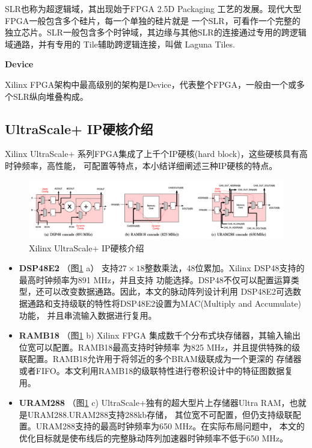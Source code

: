SLR也称为超逻辑域，其出现始于FPGA 2.5D Packaging 工艺的发展。现代大型FPGA一般包含多个硅片，每一个单独的硅片就是
一个SLR，可看作一个完整的独立芯片。SLR一般包含多个时钟域，其边缘与其他SLR的连接通过专用的跨逻辑域通路，并有专用的
Tile辅助跨逻辑连接，叫做 Laguna Tiles.


{\bf Device}

Xilinx FPGA架构中最高级别的架构是Device，代表整个FPGA，一般由一个或多个SLR纵向堆叠构成。






\subsection{UltraScale+ IP硬核介绍}

Xilinx UltraScale+ 系列FPGA集成了上千个IP硬核(hard block)，这些硬核具有高时钟频率，高性能，
可配置等特点，本小结详细阐述三种IP硬核的特点。

\begin{figure}[h]
    \centering
	\includegraphics[width=\textwidth]{figure/hardblocks}
	\caption{Xilinx UltraScale+ IP硬核介绍} 
	\label{fig:hardblocks}
\end{figure}

\begin{itemize}
    \item {\bf DSP48E2} （图\ref{fig:hardblocks} a）
    支持$27\times18$整数乘法，48位累加。Xilinx DSP48支持的最高时钟频率为891 MHz，并且支持
    功能选择。DSP48不仅可以配置运算类型，还可以改变数据通路。因此，本文的脉动阵列设计利用
    DSP48E2可选数据通路和支持级联的特性将DSP48E2设置为MAC(Multiply and Accumulate)功能，
    并且串流输入数据进行复用。
    
    \item {\bf RAMB18} （图\ref{fig:hardblocks} b)
    Xilinx FPGA 集成数千个分布式块存储器，其输入输出位宽可以配置。RAMB18最高支持时钟频率
    为825 MHz，并且提供特殊的级联配置。RAMB18允许用于将邻近的多个BRAM级联成为一个更深的
    存储器或者FIFO。本文利用RAMB18的级联特性进行卷积设计中的特征图数据复用。
    
    \item {\bf URAM288} （图\ref{fig:hardblocks} c)
    UltraScale+独有的超大型片上存储器Ultra RAM，也就是URAM288.URAM288支持288kb存储，
    其位宽不可配置，但仍支持级联配置。URAM288支持的最高时钟频率为650 MHz。在实际布局问题中，
    本文的优化目标就是使布线后的完整脉动阵列加速器时钟频率不低于650 MHz。

\end{itemize}



